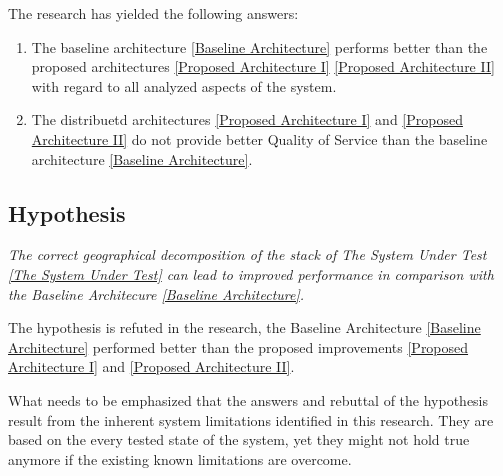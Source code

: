 \documentclass{uvamscse}
\begin{document}
The research has yielded the following answers:
\begin{enumerate}
  \item The baseline architecture \ref{Baseline Architecture} performs better than the proposed architectures \ref{Proposed Architecture I} \ref{Proposed Architecture II} with regard to all analyzed aspects of the system.
  \item The distribuetd architectures \ref{Proposed Architecture I} and \ref{Proposed Architecture II} do not provide better Quality of Service than the baseline architecture \ref{Baseline Architecture}.
\end{enumerate}

\subsection{Hypothesis}
\textit{The correct geographical decomposition of the stack of The System Under Test \ref{The System Under Test} can lead to improved performance in comparison with the Baseline Architecure \ref{Baseline Architecture}.}

The hypothesis is refuted in the research, the Baseline Architecture \ref{Baseline Architecture} performed better than the proposed improvements \ref{Proposed Architecture I} and \ref{Proposed Architecture II}.

What needs to be emphasized that the answers and rebuttal of the hypothesis result from the inherent system limitations identified in this research. They are based on the every tested state of the system, yet they might not hold true anymore if the existing known limitations are overcome.
\end{document}
